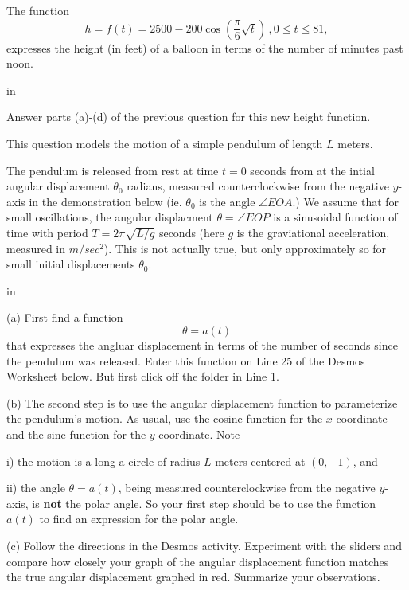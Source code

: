 \documentclass{ximera}
\newcommand{\pskip}{\vskip 0.1 in}
\begin{document}
\begin{question} \label{Q28:InverseTrig}
The function
\[
  h = f(t) = 2500 - 200 \cos \left(  \frac{\pi}{6} \sqrt{t}  \right) \, , 0\leq t \leq 81 ,
\]
expresses the height (in feet) of a balloon in terms of the number of minutes past noon.

\pskip

Answer parts (a)-(d) of the previous question for this new height function.

\end{question}


\begin{question}   \label{Q30:InverseTrig}
This question models the motion of a simple pendulum of length $L$ meters. 

The pendulum is released from rest at time $t=0$ seconds from at the intial angular displacement $\theta_0$ radians, measured counterclockwise from the negative $y$-axis in the demonstration below (ie. $\theta_0$ is the angle $\angle EOA$.)  We assume that for small oscillations, the angular displacment $\theta = \angle EOP$ is a sinusoidal function of time with period $T=2\pi \sqrt{L/g}$ seconds (here $g$ is the graviational acceleration, measured in $m/sec^2$). This is not actually true, but only approximately so for small initial displacements $\theta_0$. 

\pskip

(a) First find a function 
\[
   \theta = a(t) 
\]
that expresses the angluar displacement in terms of the number of seconds since the pendulum was released. Enter this function on Line 25 of the Desmos Worksheet below. But first click off the folder in Line 1.

(b) The second step is to use the angular displacement function to parameterize the pendulum's motion. As usual, use the cosine function for the $x$-coordinate and the sine function for the $y$-coordinate. Note 

i) the motion is a long a circle of radius $L$ meters centered at $(0,-1)$, and

ii) the angle $\theta = a(t)$, being measured counterclockwise from the negative $y$-axis,  is {\bf not} the polar angle. So your first step should be to use the function $a(t)$ to find an expression for the polar angle.

(c) Follow the directions in the Desmos activity. Experiment with the sliders and compare how closely your graph of the angular displacement function matches the true angular displacement graphed in red. Summarize your observations.



\end{question}
\end{document}
